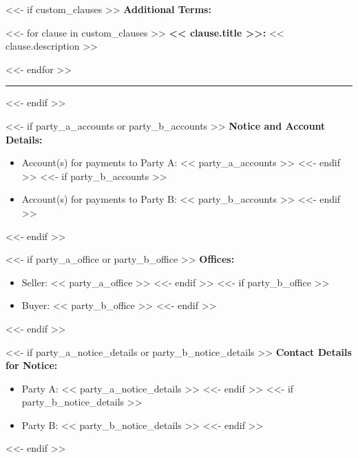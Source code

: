 \documentclass[11pt, a4paper]{article}
\begin{document}

<<- if custom_clauses >>
\noindent \textbf{Additional Terms:}
\vspace{0.2cm}

<<- for clause in custom_clauses >>
\noindent \textbf{<< clause.title >>:} << clause.description >>

\vspace{0.2cm}
<<- endfor >>
\vspace{0.3cm}
\hrule
\vspace{0.5cm}
<<- endif >>


<<- if party_a_accounts or party_b_accounts >>
\noindent \textbf{Notice and Account Details:}
\begin{itemize}[leftmargin=2cm, label={}, itemsep=3pt]
<<- if party_a_accounts >>
    \item Account(s) for payments to Party A: << party_a_accounts >>
<<- endif >>
<<- if party_b_accounts >>
    \item Account(s) for payments to Party B: << party_b_accounts >>
<<- endif >>
\end{itemize}
\vspace{0.3cm}
<<- endif >>

<<- if party_a_office or party_b_office >>
\noindent \textbf{Offices:}
\begin{itemize}[leftmargin=2cm, label={}, itemsep=3pt]
<<- if party_a_office >>
    \item Seller: << party_a_office >>
<<- endif >>
<<- if party_b_office >>
    \item Buyer: << party_b_office >>
<<- endif >>
\end{itemize}
\vspace{0.3cm}
<<- endif >>

<<- if party_a_notice_details or party_b_notice_details >>
\noindent \textbf{Contact Details for Notice:}
\begin{itemize}[leftmargin=2cm, label={}, itemsep=3pt]
<<- if party_a_notice_details >>
    \item Party A: << party_a_notice_details >>
<<- endif >>
<<- if party_b_notice_details >>
    \item Party B: << party_b_notice_details >>
<<- endif >>
\end{itemize}
\vspace{0.3cm}
<<- endif >>
\end{document}

